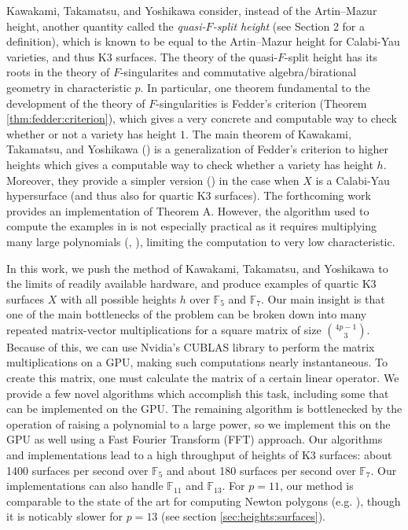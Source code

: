 Kawakami, Takamatsu, and Yoshikawa consider, 
instead of the Artin--Mazur height, another quantity called the
\textit{quasi-\(F\)-split height} 
(see Section 2 for a definition),
which is known to be equal to the Artin--Mazur height
for Calabi-Yau varieties, and thus K3 surfaces.
The theory of the quasi-\(F\)-split height has its
roots in the theory of \(F\)-singularites and commutative
algebra/birational geometry in characteristic \(p\).
In particular, one theorem fundamental
to the development of the theory of \(F\)-singularities
is Fedder's criterion (Theorem \ref{thm:fedder:criterion}), 
which gives a very concrete and computable way to check
whether or not a variety has height \(1\).
The main theorem of Kawakami, Takamatsu, and Yoshikawa
(\cite[Theorem~A]{kty-2022-fedder})
is a generalization of Fedder's criterion
to higher heights which gives a 
computable way to check whether a variety has height \(h\).
Moreover, they provide a simpler version
(\cite[Theorem~C]{kty-2022-fedder})
in the case when \(X\) is a Calabi-Yau hypersurface
(and thus also for quartic K3 surfaces).
The forthcoming work 
\cite{fgmqt-2025-witt-vectors-macaulay2} 
provides an implementation of Theorem A.
However, the algorithm used to compute the examples in
\cite{kty-2022-fedder}
is not especially practical
as it requires multiplying many large polynomials
(\cite{takamatsu-2024-algorithm}, 
\cite{fgmqt-2025-witt-vectors-macaulay2}),
limiting the computation to
very low characteristic.



In this work, we push the method of Kawakami,
Takamatsu, and Yoshikawa to the limits of readily
available hardware, 
and produce examples of quartic K3 surfaces \(X\) with all
possible heights \(h\) 
over \(\mathbb{F}_{5}\) and \(\mathbb{F}_{7}\).
Our main insight is that one of the main
bottlenecks of the problem can be broken down 
into many repeated matrix-vector
multiplications for a square matrix of size 
\(\binom{4p-1}{3}\).
Because of this, we can use Nvidia's CUBLAS library 
\cite{nvidia-2024-cublas}
to perform the matrix multiplications
on a GPU, making such computations
nearly instantaneous.
To create this matrix, one must calculate the matrix of a
certain linear operator.
We provide a few novel algorithms which accomplish this task,
including some that can be implemented on the GPU.
The remaining algorithm is bottlenecked by the operation
of raising a polynomial to a large power, 
so we implement this on the GPU as well using 
a Fast Fourier Transform (FFT) approach.
Our algorithms and implementations lead to a high throughput
of heights of K3 surfaces: 
about 1400 surfaces per second over \(\mathbb{F}_{5}\) and
about 180 surfaces per second over \(\mathbb{F}_{7}\).
Our implementations can also handle \(\mathbb{F}_{11}\) 
and \(\mathbb{F}_{13}\). 
For \(p = 11\), our method is comparable to the state of the art
for computing Newton polygons (e.g. 
\cite{chk-2019-toric-controlled-reduction}),
though it is noticably slower 
for \(p = 13\) (see section \ref{sec:heights:surfaces}).

